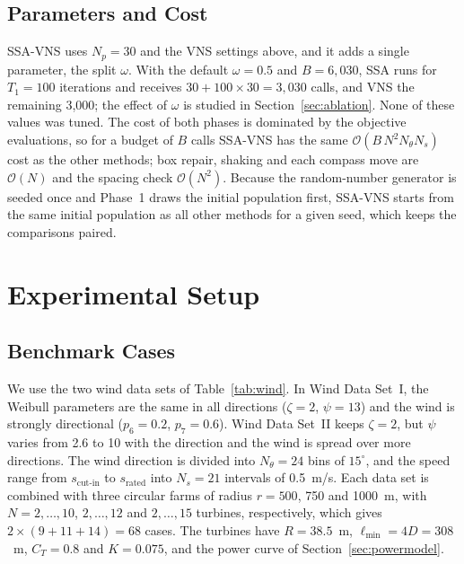 \documentclass[journal,twoside]{IEEEtran}
\begin{document}
\subsection{Parameters and Cost}
SSA-VNS uses $N_p=30$ and the VNS settings above, and it adds a single parameter, the split $\omega$. With the default $\omega=0.5$ and $B=6{,}030$, SSA runs for $T_1=100$ iterations and receives $30+100\times30=3{,}030$ calls, and VNS the remaining 3,000; the effect of $\omega$ is studied in Section~\ref{sec:ablation}. None of these values was tuned. The cost of both phases is dominated by the objective evaluations, so for a budget of $B$ calls SSA-VNS has the same $\mathcal O(B\,N^2N_\theta N_s)$ cost as the other methods; box repair, shaking and each compass move are $\mathcal O(N)$ and the spacing check $\mathcal O(N^2)$. Because the random-number generator is seeded once and Phase~1 draws the initial population first, SSA-VNS starts from the same initial population as all other methods for a given seed, which keeps the comparisons paired.

\section{Experimental Setup}
\label{sec:setup}

\subsection{Benchmark Cases}
We use the two wind data sets of Table~\ref{tab:wind}. In Wind Data Set~I, the Weibull parameters are the same in all directions ($\zeta=2$, $\psi=13$) and the wind is strongly directional ($p_6=0.2$, $p_7=0.6$). Wind Data Set~II keeps $\zeta=2$, but $\psi$ varies from 2.6 to 10 with the direction and the wind is spread over more directions. The wind direction is divided into $N_\theta=24$ bins of $15^\circ$, and the speed range from $s_{\text{cut-in}}$ to $s_{\text{rated}}$ into $N_s=21$ intervals of 0.5~m/s. Each data set is combined with three circular farms of radius $r=500$, 750 and 1000~m, with $N=2,\ldots,10$, $2,\ldots,12$ and $2,\ldots,15$ turbines, respectively, which gives $2\times(9+11+14)=68$ cases. The turbines have $R=38.5$~m, $\ell_{\min}=4D=308$~m, $C_T=0.8$ and $K=0.075$, and the power curve of Section~\ref{sec:powermodel}.
\end{document}
